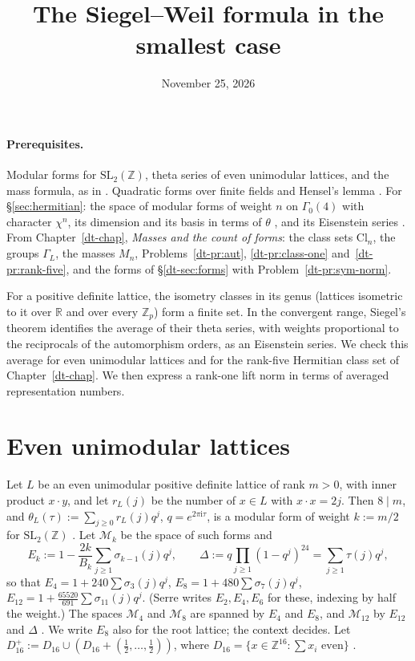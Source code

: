 \documentclass[reqno]{amsart}
\title{The Siegel--Weil formula in the smallest case}
\author{}
\date{November 25, 2026}
\newcounter{chap}
\theoremstyle{definition}
\theoremstyle{plain}
\newcommand{\Z}{\mathbb{Z}}
\newcommand{\R}{\mathbb{R}}
\newcommand{\ii}{\mathrm{i}}
\newcommand{\Mf}{\mathcal{M}}
\newcommand{\Cl}{\mathrm{Cl}}
\begin{document}
\maketitle
{}\label{chap}

\paragraph{Prerequisites.}
Modular forms for \(\mathrm{SL}_2(\Z)\), theta series of even unimodular lattices, and the mass formula, as in \cite[Ch.~V, \S2.3 and Ch.~VII, \S\S2--6]{SeA}.  Quadratic forms over finite fields \cite[Ch.~IV, \S1.7]{SeA} and Hensel's lemma \cite[Ch.~II, \S2.2]{SeA}.  For \S\ref{sec:hermitian}: the space of modular forms of weight \(n\) on \(\Gamma_0(4)\) with character \(\chi^n\), its dimension and its basis in terms of \(\theta\) \cite[Ch.~IV, \S1]{Ko}, and its Eisenstein series \cite[\S4.5]{DS}.  From Chapter~\ref{dt-chap}, \emph{Masses and the count of forms}: the class sets \(\Cl_n\), the groups \(\Gamma_L\), the masses \(M_n\), Problems~\ref{dt-pr:aut}, \ref{dt-pr:class-one} and~\ref{dt-pr:rank-five}, and the forms of \S\ref{dt-sec:forms} with Problem~\ref{dt-pr:sym-norm}.

For a positive definite lattice, the isometry classes in its genus (lattices isometric to it over \(\R\) and over every \(\Z_p\)) form a finite set.  In the convergent range, Siegel's theorem identifies the average of their theta series, with weights proportional to the reciprocals of the automorphism orders, as an Eisenstein series.  We check this average for even unimodular lattices and for the rank-five Hermitian class set of Chapter~\ref{dt-chap}.  We then express a rank-one lift norm in terms of averaged representation numbers.


\section{Even unimodular lattices}\label{sec:even}

Let \(L\) be an even unimodular positive definite lattice of rank \(m>0\), with inner product \(x\cdot y\), and let \(r_L(j)\) be the number of \(x \in L\) with \(x \cdot x = 2j\).  Then \(8 \mid m\), and \(\theta_L(\tau) := \sum_{j \ge 0} r_L(j) q^j\), \(q = e^{2\pi\ii\tau}\), is a modular form of weight \(k := m/2\) for \(\mathrm{SL}_2(\Z)\) \cite[Ch.~VII, Theorem~8]{SeA}.  Let \(\Mf_k\) be the space of such forms and
\[
  E_k := 1 - \frac{2k}{B_k} \sum_{j \ge 1} \sigma_{k-1}(j) q^j, \qquad \Delta := q\prod_{j \ge 1}(1-q^j)^{24} = \sum_{j \ge 1} \tau(j) q^j ,
\]
so that \(E_4 = 1 + 240\sum \sigma_3(j)q^j\), \(E_8 = 1 + 480\sum\sigma_7(j)q^j\), \(E_{12} = 1 + \frac{65520}{691}\sum\sigma_{11}(j)q^j\).  (Serre writes \(E_2, E_4, E_6\) for these, indexing by half the weight.)  The spaces \(\Mf_4\) and \(\Mf_8\) are spanned by \(E_4\) and \(E_8\), and \(\Mf_{12}\) by \(E_{12}\) and \(\Delta\) \cite[Ch.~VII, \S3.2]{SeA}.  We write \(E_8\) also for the root lattice; the context decides.  Let \(D_{16}^+ := D_{16} \cup (D_{16} + (\tfrac12, \dots, \tfrac12))\), where \(D_{16} = \{x \in \Z^{16} : \sum x_i \text{ even}\}\) \cite[Ch.~4, \S7]{CoS}.
\end{document}

